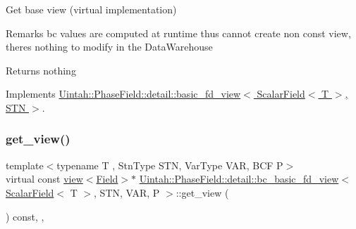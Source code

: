 Get base view (virtual implementation) 

\begin{DoxyRemark}{Remarks}
bc values are computed at runtime thus cannot create non const view, there\textquotesingle{}s nothing to modify in the Data\+Warehouse
\end{DoxyRemark}
\begin{DoxyReturn}{Returns}
nothing 
\end{DoxyReturn}


Implements \hyperlink{classUintah_1_1PhaseField_1_1detail_1_1basic__fd__view_3_01ScalarField_3_01T_01_4_00_01STN_01_4_a2bbf870b332cfd997ec5297428019bc8}{Uintah\+::\+Phase\+Field\+::detail\+::basic\+\_\+fd\+\_\+view$<$ Scalar\+Field$<$ T $>$, S\+T\+N $>$}.

\mbox{\label{classUintah_1_1PhaseField_1_1detail_1_1bc__basic__fd__view_3_01ScalarField_3_01T_01_4_00_01STN_00_01VAR_00_01P_01_4_aa82811e38cba5075406deb5e0f4adf62}} 
\subsubsection{\texorpdfstring{get\+\_\+view()}{get\_view()}\hspace{0.1cm}{\footnotesize\ttfamily [2/2]}}
{\footnotesize\ttfamily template$<$typename T , Stn\+Type S\+TN, Var\+Type V\+AR, B\+CF P$>$ \\
virtual const \hyperlink{classUintah_1_1PhaseField_1_1detail_1_1view}{view}$<$\hyperlink{structUintah_1_1PhaseField_1_1ScalarField}{Field}$>$$\ast$ \hyperlink{classUintah_1_1PhaseField_1_1detail_1_1bc__basic__fd__view}{Uintah\+::\+Phase\+Field\+::detail\+::bc\+\_\+basic\+\_\+fd\+\_\+view}$<$ \hyperlink{structUintah_1_1PhaseField_1_1ScalarField}{Scalar\+Field}$<$ T $>$, S\+TN, V\+AR, P $>$\+::get\+\_\+view (\begin{DoxyParamCaption}{ }\end{DoxyParamCaption}) const\hspace{0.3cm}{\ttfamily [inline]}, {\ttfamily [override]}, {\ttfamily [virtual]}}



